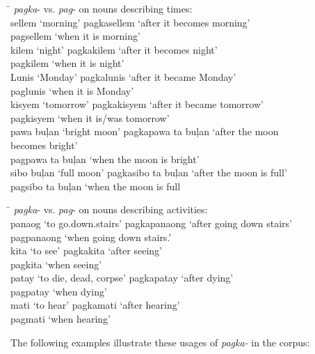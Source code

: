 \newpage
\ea
\label{bkm:Ref116460168}
\begin{tabbing}
\hspace{4.1cm} \= \kill
\textit{pagka}{}- vs. \textit{pag}{}- on nouns describing times: \\
sellem ‘morning’ \> pagkasellem ‘after it becomes morning’ \\
\>  pagsellem ‘when it is morning’ \\
kilem ‘night’ \> pagkakilem ‘after it becomes night’ \\
\>   pagkilem ‘when it is night’ \\
Lunis ‘Monday’ \> pagkalunis ‘after it became Monday’ \\
\>       paglunis ‘when it is Monday’ \\
kisyem ‘tomorrow’ \> pagkakisyem ‘after it became tomorrow’ \\
\>  pagkisyem ‘when it is/was tomorrow’ \\
pawa buļan ‘bright moon’ \> pagkapawa ta buļan ‘after the moon \\
\> becomes bright’ \\
\>   pagpawa ta buļan ‘when the moon is bright’ \\
sibo buļan ‘full moon’ \> pagkasibo ta buļan ‘after the moon is full’ \\
\>      pagsibo ta buļan ‘when the moon is full
\end{tabbing}
\z
\ea
\label{bkm:Ref116460171}
\begin{tabbing}
\hspace{4.3cm} \= \kill
\textit{pagka}{}- vs. \textit{pag}{}- on nouns describing activities: \\
panaog ‘to go.down.stairs’ \> pagkapanaong ‘after going down stairs’ \\
\>       pagpanaong ‘when going down stairs.’ \\
kita ‘to see’ \>   pagkakita ‘after seeing’ \\
\>       pagkita ‘when seeing’ \\
patay ‘to die, dead, corpse’ \> pagkapatay ‘after dying’ \\
\>       pagpatay ‘when dying’ \\
mati ‘to hear’ \> pagkamati ‘after hearing’ \\
\>        pagmati ‘when hearing’
\end{tabbing}
\z

The following examples illustrate these usages of \textit{pagka-} in the corpus:

